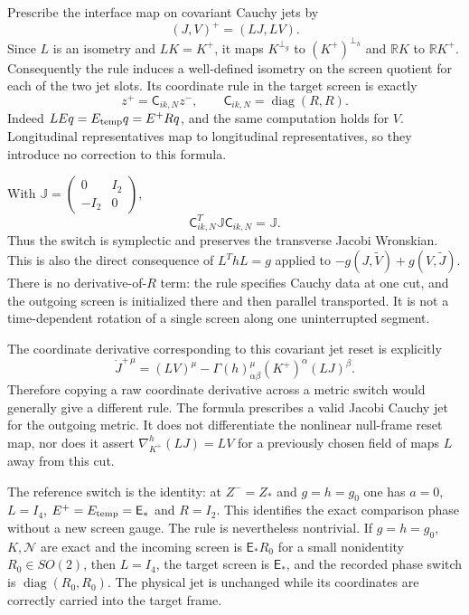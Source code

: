\documentclass[
  english,
  11pt,
  reqno]{amsart}
\begin{document}
Prescribe the interface map on covariant Cauchy jets by \[
 (J,V)^+=(LJ,LV).
\] Since \(L\) is an isometry and \(LK=K^+\), it maps \(K^{\perp_g}\) to
\((K^+)^{\perp_h}\) and \(\mathbb RK\) to \(\mathbb RK^+\). Consequently
the rule induces a well-defined isometry on the screen quotient for each
of the two jet slots. Its coordinate rule in the target screen is
exactly \[
 z^+=\mathsf C_{ik,N}z^-,
 \qquad
 \mathsf C_{ik,N}=\operatorname{diag}(R,R).
\] Indeed \(LEq=E_{\rm temp}q=E^+Rq\), and the same computation holds
for \(V\). Longitudinal representatives map to longitudinal
representatives, so they introduce no correction to this formula.

With
\(\mathbb J=\left(\begin{smallmatrix}0&I_2\\-I_2&0\end{smallmatrix}\right)\),
\[
 \mathsf C_{ik,N}^T\mathbb J\mathsf C_{ik,N}=\mathbb J.
\] Thus the switch is symplectic and preserves the transverse Jacobi
Wronskian. This is also the direct consequence of \(L^ThL=g\) applied to
\(-g(J,\widetilde V)+g(V,\widetilde J)\). There is no
derivative-of-\(R\) term: the rule specifies Cauchy data at one cut, and
the outgoing screen is initialized there and then parallel transported.
It is not a time-dependent rotation of a single screen along one
uninterrupted segment.

The coordinate derivative corresponding to this covariant jet reset is
explicitly \[
 \dot J^{+\,\mu}=(LV)^\mu
       -\Gamma(h)^\mu_{\alpha\beta}(K^+)^\alpha(LJ)^\beta.
\] Therefore copying a raw coordinate derivative across a metric switch
would generally give a different rule. The formula prescribes a valid
Jacobi Cauchy jet for the outgoing metric. It does not differentiate the
nonlinear null-frame reset map, nor does it assert
\(\nabla^h_{K^+}(LJ)=LV\) for a previously chosen field of maps \(L\)
away from this cut.

The reference switch is the identity: at \(Z^-=Z_*\) and \(g=h=g_0\) one
has \(a=0\), \(L=I_4\), \(E^+=E_{\rm temp}=\mathsf E_*\) and \(R=I_2\).
This identifies the exact comparison phase without a new screen gauge.
The rule is nevertheless nontrivial. If \(g=h=g_0\), \(K,\mathcal N\)
are exact and the incoming screen is \(\mathsf E_*R_0\) for a small
nonidentity \(R_0\in SO(2)\), then \(L=I_4\), the target screen is
\(\mathsf E_*\), and the recorded phase switch is
\(\operatorname{diag}(R_0,R_0)\). The physical jet is unchanged while
its coordinates are correctly carried into the target frame.
\end{document}
